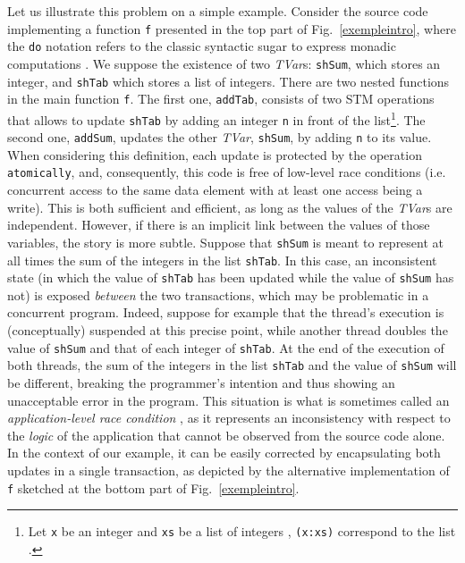 \documentclass[submission,copyright,creativecommons]{eptcs}
\begin{document}
Let us illustrate this problem on a simple example. Consider the source code implementing a function \texttt{f} presented in the top part of Fig.~\ref{exempleintro}, where the {\tt do} notation refers to the classic syntactic sugar to express monadic computations \cite{transactional-memory-data,report-programming-language}.   
We suppose the existence of two \emph{TVar}s: \texttt{shSum}, which stores an integer, and \texttt{shTab} which stores a list of integers.
There are two nested functions in the main function {\tt f}.
The first one, \texttt{addTab}, consists of two STM operations that allows to update \texttt{shTab} by adding an integer {\tt n} in front of the list\footnote{Let \texttt{x} be an integer and \texttt{xs} be a list of integers , \texttt{(x:xs)} correspond to the list .}. The second one, \texttt{addSum}, updates the other \emph{TVar}, \texttt{shSum}, by adding {\tt n} to its value. 
When considering this definition, each update is protected by the operation {\tt atomically}, and, consequently, this code is free of low-level race conditions (i.e. concurrent access to the same data element with at least one access being a write). 
This is both sufficient and efficient, as long as the values of the \emph{TVar}s are independent. 
However, if there is an implicit link between the values of those variables, the story is more subtle. Suppose that {\tt shSum} is meant to represent at all times the sum of the integers in the list {\tt shTab}.
In this case, an inconsistent state (in which the value of {\tt shTab} has been updated while the value of {\tt shSum} has not) is exposed {\em between} the two transactions, which may be problematic in a concurrent program. 
Indeed, suppose for example that the thread's execution is (conceptually) suspended at this precise point, while another thread doubles the value of {\tt shSum} and that of each integer of {\tt shTab}. 
At the end of the execution of both threads, the sum of the integers in the list {\tt shTab} and the value of {\tt shSum} will be different, breaking the programmer's intention and thus showing an unacceptable error in the program. 
This situation is what is sometimes called an {\em application-level race condition} \cite{verifying-correct-usage,rdemeyer:framework-verifying-application}, as it represents an inconsistency with respect to the {\em logic} of the application that cannot be observed from the source code alone. 
In the context of our example, it can be easily corrected by encapsulating both updates in a single transaction, as depicted by the alternative implementation of \texttt{f} sketched at the bottom part of Fig.~\ref{exempleintro}.
\end{document}
